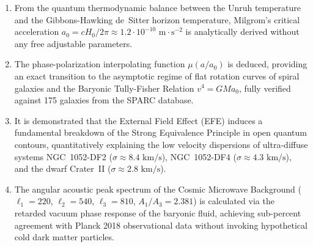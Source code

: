 \begin{enumerate}
\item From the quantum thermodynamic balance between the Unruh temperature and the Gibbons-Hawking de~Sitter horizon temperature, Milgrom's critical acceleration $a_0 = c H_0 / 2\pi \approx 1.2 \cdot 10^{-10}\text{ m}\cdot\text{s}^{-2}$ is analytically derived without any free adjustable parameters.
\item The phase-polarization interpolating function $\mu(a/a_0)$ is deduced, providing an exact transition to the asymptotic regime of flat rotation curves of spiral galaxies and the Baryonic Tully-Fisher Relation $v^4 = G M a_0$, fully verified against 175 galaxies from the SPARC database.
\item It is demonstrated that the External Field Effect (EFE) induces a fundamental breakdown of the Strong Equivalence Principle in open quantum contours, quantitatively explaining the low velocity dispersions of ultra-diffuse systems NGC~1052-DF2 ($\sigma \approx 8.4\text{ km/s}$), NGC~1052-DF4 ($\sigma \approx 4.3\text{ km/s}$), and the dwarf Crater~II ($\sigma \approx 2.8\text{ km/s}$).
\item The angular acoustic peak spectrum of the Cosmic Microwave Background ($\ell_1=220$, $\ell_2=540$, $\ell_3=810$, $A_1/A_3=2.381$) is calculated via the retarded vacuum phase response of the baryonic fluid, achieving sub-percent agreement with Planck 2018 observational data without invoking hypothetical cold dark matter particles.
\end{enumerate}
